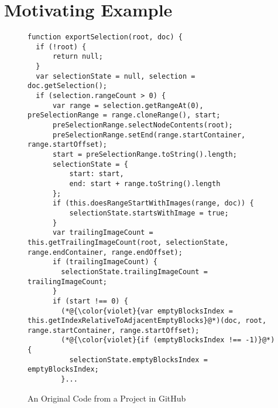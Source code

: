 \section{Motivating Example}
\label{example_section}



\begin{figure}[t]
	\centering
	\begin{lstlisting}[]
function exportSelection(root, doc) {
  if (!root) {
      return null;
  }
  var selectionState = null, selection = doc.getSelection();
  if (selection.rangeCount > 0) {
      var range = selection.getRangeAt(0), preSelectionRange = range.cloneRange(), start;
      preSelectionRange.selectNodeContents(root);
      preSelectionRange.setEnd(range.startContainer, range.startOffset);
      start = preSelectionRange.toString().length;
      selectionState = {
          start: start,
          end: start + range.toString().length
      };
      if (this.doesRangeStartWithImages(range, doc)) {
          selectionState.startsWithImage = true;
      }
      var trailingImageCount = this.getTrailingImageCount(root, selectionState, range.endContainer, range.endOffset);
      if (trailingImageCount) {
        selectionState.trailingImageCount = trailingImageCount;
      }
      if (start !== 0) {
        (*@{\color{violet}{var emptyBlocksIndex = this.getIndexRelativeToAdjacentEmptyBlocks}@*)(doc, root, range.startContainer, range.startOffset);
        (*@{\color{violet}{if (emptyBlocksIndex !== -1)}@*) {
          selectionState.emptyBlocksIndex = emptyBlocksIndex;
        }...
        \end{lstlisting}
\vspace{-12pt}
\caption{An Original Code from a Project in GitHub}
\label{example_org}
\end{figure}


